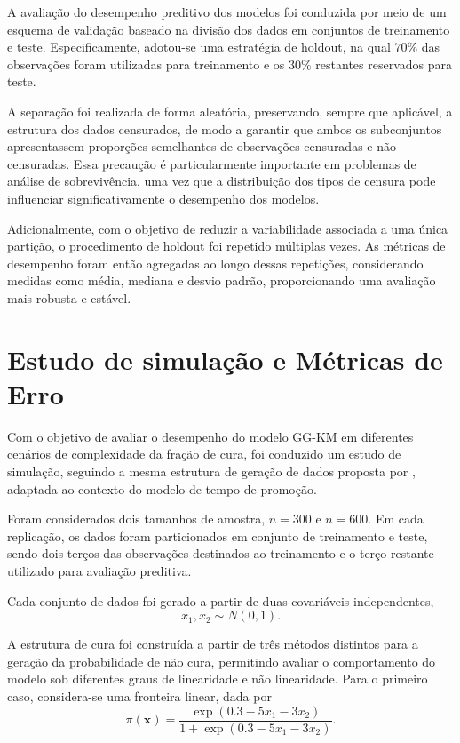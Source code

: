 A avaliação do desempenho preditivo dos modelos foi conduzida por meio de um esquema de
validação baseado na divisão dos dados em conjuntos de treinamento e teste. Especificamente,
adotou-se uma estratégia de holdout, na qual $70\%$ das observações foram utilizadas para
treinamento e os $30\%$ restantes reservados para teste.

A separação foi realizada de forma aleatória, preservando, sempre que aplicável, a estrutura
dos dados censurados, de modo a garantir que ambos os subconjuntos apresentassem proporções
semelhantes de observações censuradas e não censuradas. Essa precaução é particularmente
importante em problemas de análise de sobrevivência, uma vez que a distribuição dos tipos de
censura pode influenciar significativamente o desempenho dos modelos.

Adicionalmente, com o objetivo de reduzir a variabilidade associada a uma única partição,
o procedimento de holdout foi repetido múltiplas vezes. As métricas de desempenho foram então agregadas ao longo dessas
repetições, considerando medidas como média, mediana e desvio padrão, proporcionando uma
avaliação mais robusta e estável.

\section{Estudo de simulação e Métricas de Erro}

Com o objetivo de avaliar o desempenho do modelo GG-KM em diferentes cenários de complexidade da fração
de cura, foi conduzido um estudo de simulação, seguindo a mesma estrutura de geração
de dados proposta por , adaptada ao contexto do modelo de tempo de promoção.

Foram considerados dois tamanhos de amostra, $n=300$ e $n=600$. Em cada replicação, os dados foram
particionados em conjunto de treinamento e teste, sendo dois terços das observações destinados ao
treinamento e o terço restante utilizado para avaliação preditiva.

Cada conjunto de dados foi gerado a partir de duas covariáveis independentes,
\[
x_1,x_2 \sim N(0,1).
\]

A estrutura de cura foi construída a partir de três métodos distintos para a geração da probabilidade
de não cura, permitindo avaliar o comportamento do modelo sob diferentes graus de linearidade e não
linearidade. Para o primeiro caso, considera-se uma fronteira linear, dada por
\[
\pi(\mathbf{x})
=
\frac{\exp(0.3-5x_1-3x_2)}
{1+\exp(0.3-5x_1-3x_2)}.
\]

